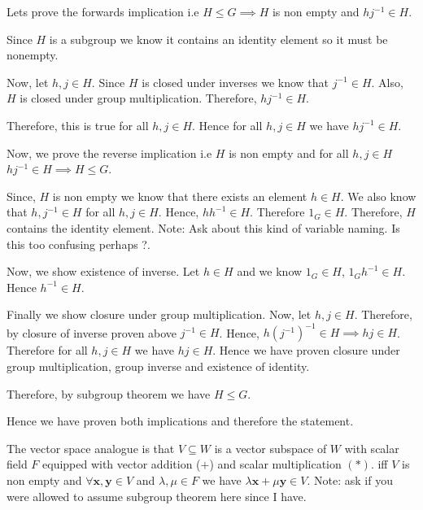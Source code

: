 \begin{solution}
 Lets prove the forwards implication i.e \( H \le G \implies H  \) is non empty and \( hj^{-1} \in H\).

 Since \( H \) is a subgroup we know it contains an identity element so it must be nonempty.  

 Now, let \( h,j \in H \). Since \( H \) is closed under inverses we know that \( j^{-1} \in H \).
 Also, \( H \) is closed under group multiplication. Therefore, \( h j^{-1} \in H \).

 Therefore, this is true for all \( h,j \in H  \). Hence for all \( h,j \in H \) we have \( hj^{-1} \in H \).

 Now, we prove the reverse implication i.e \( H  \) is non empty and for all \( h,j \in H \) \( hj^{-1} \in H \implies H \le G \).

 Since, \( H \) is non empty we know that there exists an element \( h \in H  \). We also know that \( h,j^{-1} \in H \) for all
 \( h,j \in  H\). Hence, \( h h^{-1} \in H \). Therefore \( 1_{G} \in H \). Therefore,
 \( H \) contains the identity element.
 Note: Ask about this kind of variable naming. Is this too confusing perhaps ?.

 Now, we show existence of inverse. Let \( h \in H \) and we know \( 1_{G} \in H \), \( 1_{G}h^{-1} \in H\). Hence \( h^{-1} \in H\).

 Finally we show closure under group multiplication.
 Now, let \( h, j \in H \). Therefore, by closure of inverse proven above \( j^{-1} \in H  \). Hence,
 \( h(j^{-1})^{-1} \in H \implies hj \in H\). Therefore for all \(h,j \in H  \) we have \( hj \in H \).
 Hence we have proven closure under group multiplication, group inverse and existence of identity.

 Therefore, by subgroup theorem we have \( H \le G \).

 Hence we have proven both implications and therefore the statement.

 The vector space analogue is that \( V  \subseteq W \) is a vector subspace of \(W  \) with scalar field \( F \) equipped with vector addition (\( + \)) and scalar multiplication \( (*) \).
 iff \( V \) is non empty and \( \forall \mathbf{x},\mathbf{y} \in V   \) and \( \lambda, \mu   \in F \) we have \(\lambda \mathbf{x} + \mu  \mathbf{y}  \in V\).
 Note: ask if you were allowed to assume subgroup theorem here since I have.
\end{solution}

